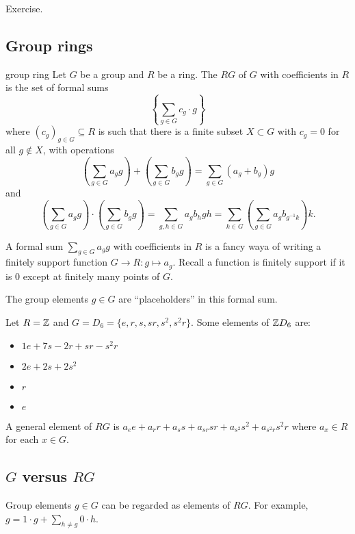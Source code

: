\documentclass[12pt,letterpaper]{report}
\begin{document}
\begin{thmproof}
  Exercise.
\end{thmproof}

\pagebreak
\subsection{Group rings}

\begin{defn}{group ring}{}
  Let $G$ be a group and $R$ be a ring.
  The  $RG$ of $G$ with coefficients in $R$ is the set of formal sums
  \[
    \left\{ \sum_{g \in G} c_g \cdot g \right\}
  \]
  where $(c_g)_{g \in G} \subseteq R$ is such that there is a finite subset $X \subset G$ with
  $c_g = 0$ for all $g \not\in X$, with operations
  \[
    \left(\sum_{g \in G} a_g g\right) + \left(\sum_{g \in G} b_g g\right)
      = \sum_{g \in G} (a_g + b_g) g
  \]
  and
  \[
    \left(\sum_{g \in G} a_g g\right) \cdot \left(\sum_{g \in G} b_g g\right)
      = \sum_{g, h \in G} a_g b_h gh = \sum_{k \in G} \left(\sum_{g \in G} a_g b_{g^{-1}k}\right) k.
  \]
\end{defn}

A formal sum $\sum_{g \in G} a_g g$ with coefficients in $R$ is a fancy waya of writing a finitely
support function $G \to R : g \mapsto a_g$.
Recall a function is finitely support if it is 0 except at finitely many points of $G$.

The group elements $g \in G$ are ``placeholders'' in this formal sum.

\begin{ex}
  Let $R = \mathbb{Z}$ and $G = D_6 = \{e, r, s, sr, s^2, s^2r\}$.
  Some elements of $\mathbb{Z} D_6$ are:
  \begin{itemize}
    \item $1e + 7s - 2r + sr - s^2r$
    \item $2e + 2s + 2s^2$
    \item $r$
    \item $e$
  \end{itemize}
  A general element of $RG$ is $a_e e + a_r r + a_s s + a_{sr} sr + a_{s^2} s^2 + a_{s^2r} s^2r$
  where $a_x \in R$ for each $x \in G$.
\end{ex}

\pagebreak
\subsection[G versus RG]{$G$ versus $RG$}

Group elements $g \in G$ can be regarded as elements of $RG$.
For example, $g = 1 \cdot g + \sum_{h \neq g} 0 \cdot h$.
\end{document}
